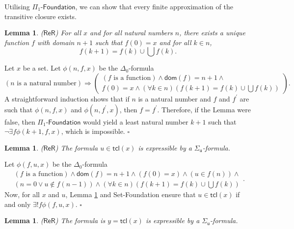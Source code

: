 \documentclass[11pt, a4paper]{article}
\newtheorem{lemma}[theorem]{Lemma}
\newenvironment{proof}[1][Proof]{\begin{trivlist}
\item[\hskip \labelsep {\bfseries #1}]}{\end{trivlist}}
\begin{document}
Utilising $\Pi_1\textsf{-Foundation}$, we can show that every finite approximation of the transitive closure exists.

\begin{lemma} \label{Th:FiniteApproximationsOfTCl}
($\mathsf{ReR}$) For all $x$ and for all natural numbers $n$, there exists a unique function $f$ with domain $n+1$ such that $f(0)=x$ and for all $k \in n$, 
\[
f(k+1)= f(k) \cup \bigcup f(k).
\]
\end{lemma}

\begin{proof}
Let $x$ be a set. Let $\phi(n, f, x)$ be the $\Delta_0$-formula 
\[
(n \textrm{ is a natural number}) \Rightarrow \left(\begin{array}{c}
(f \textrm{ is a function}) \land \mathsf{dom}(f)=n+1 \land\\
f(0)= x \land (\forall k \in n)\left(f(k+1)= f(k) \cup \bigcup f(k)\right) 
\end{array} \right).
\]
A straightforward induction shows that if $n$ is a natural number and $f$ and $f^\prime$ are such that $\phi(n, f, x)$ and $\phi(n, f^\prime, x)$, then $f=f^\prime$. Therefore, if the Lemma were false, then $\Pi_1\textsf{-Foundation}$ would yield a least natural number $k+1$ such that $\neg \exists f \phi(k+1, f, x)$, which is impossible. \hfill$\square$
\end{proof}

\begin{lemma} \label{Th:TClMembershipComplexity}
($\mathsf{ReR}$) The formula $u \in \mathsf{tcl}(x)$ is expressible by a $\Sigma_{\mathsf{u}}$-formula.
\end{lemma}

\begin{proof}
Let $\phi(f, u, x)$ be the $\Delta_0$-formula
\[
\begin{array}{c}
(f \textrm{ is a function}) \land \mathsf{dom}(f)=n+1 \land (f(0)=x) \land (u \in f(n)) \land\\ 
(n=0 \lor u \notin f(n-1)) \land (\forall k \in n) \left(f(k+1)= f(k) \cup  \bigcup f(k) \right)
\end{array}.
\]
Now, for all $x$ and $u$, Lemma \ref{Th:FiniteApproximationsOfTCl} and \textsf{Set-Foundation} ensure that $u \in \mathsf{tcl}(x)$ if and only $\exists! f \phi(f, u, x)$. \hfill$\square$  
\end{proof}

\begin{lemma} \label{Th:TClSigmaComplexity}
($\mathsf{ReR}$) The formula is $y=\mathsf{tcl}(x)$ is expressible by a $\Sigma_{\mathsf{u}}$-formula. 
\end{lemma}
\end{document}
